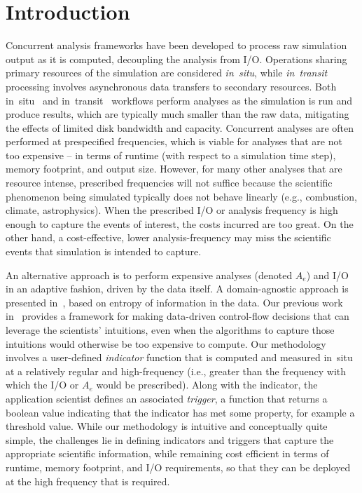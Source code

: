 \documentclass{sig-alternate}
\begin{document}
\section{Introduction}
Concurrent analysis frameworks have been developed to process  raw simulation output as it is computed, decoupling the analysis from I/O. 
Operations sharing primary resources of the simulation are considered \emph{in~situ}, while \emph{in~transit} processing involves asynchronous data transfers to secondary resources. 
Both in~situ~\cite{Yu2010,visit:2011, paraview:ldav11}  and
in~transit~\cite{glean:ldav11, JITStaging, Bennett:2012} workflows perform
analyses as the simulation is run and produce results, which are typically much
smaller than the raw data, mitigating the effects of limited disk bandwidth and
capacity.  Concurrent analyses are often performed at prespecified frequencies, which is  viable  for analyses that are not too expensive -- in terms of runtime
(with respect to a simulation time step), memory footprint, and output size.  However, for many  other analyses 
that are resource intense, prescribed frequencies will not suffice because the 
scientific phenomenon being simulated typically does not behave linearly (e.g., combustion, climate,
astrophysics).  When the prescribed I/O or analysis frequency  is high enough to capture the events of interest, the costs incurred are 
too great. On the other hand, a cost-effective, lower analysis-frequency  may miss the scientific events that simulation is intended to capture.

An alternative approach is to perform expensive analyses (denoted $A_e$) and I/O in an
adaptive fashion, driven by the data itself.   A domain-agnostic approach is
presented in~\cite{nouanesengsy2014adr,
modelPaper}, based on entropy of information in the data.   
Our previous work in~\cite{cema-insitu} provides a framework for 
making data-driven control-flow decisions that can leverage the scientists'
intuitions, even when the algorithms to capture those
intuitions would otherwise be too expensive to compute. 
Our methodology involves a user-defined \emph{indicator} function that is computed and measured in~situ 
at a relatively regular and high-frequency (i.e., greater than the frequency
with which the I/O or $A_e$ would be prescribed).  Along with the indicator, the application scientist
defines an associated \emph{trigger}, a function that returns a boolean value
indicating that the indicator has met some property, for example a threshold
value.  While our  methodology is intuitive and conceptually quite simple,
the challenges lie in defining indicators and triggers that capture the appropriate
scientific information, while remaining cost efficient in terms of runtime, memory footprint, and I/O
requirements, so that they can be deployed at the high frequency that is required.  
\end{document}
